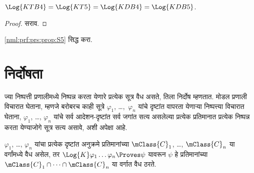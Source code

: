 \begin{prop}\label{nml:prf:prs:prop:S5}
  $\Log{KTB4} = \Log{KT5} = \Log{KDB4} = \Log{KDB5}$.
\end{prop}

\begin{proof}
  सराव.
\end{proof}

\begin{prob}
  \ref{nml:prf:prs:prop:S5} सिद्ध करा.
\end{prob}














\section{निर्दोषता}\label{nml:prf:snd:sec}

ज्या निष्पत्ती प्रणालीमध्ये निष्पन्न
करता येणारे प्रत्येक सूत्र वैध असते, तिला निर्दोष
म्हणतात. मोडल प्रणाली विचारात घेताना, म्हणजे
 बरोबरच काही सूत्रे $\varphi_1$,
\dots,~$\varphi_n$ यांचे दृष्टांत वापरता येणाऱ्या
निष्पत्त्या विचारात घेताना, $\varphi_1$, \dots,
$\varphi_n$ यांचे सर्व आदेशन-दृष्टांत सर्व जगांत सत्य असलेल्या
प्रत्येक प्रतिमानात प्रत्येक निष्पन्न करता येण्याजोगे सूत्र सत्य असावे,
अशी अपेक्षा आहे.

\begin{thm}[निर्दोषता प्रमेय]\label{nml:prf:snd:thm:soundness}
  $\varphi_1$, \dots, $\varphi_n$ यांचा प्रत्येक दृष्टांत
  अनुक्रमे प्रतिमानांच्या $\mClass{C}_1$, \dots,
  $\mClass{C}_n$ या वर्गांमध्ये वैध असेल,
  तर $\Log{K}\varphi_1\dots \varphi_n
  \Proves \psi$ यावरून $\psi$ हे प्रतिमानांच्या
  $\mClass{C}_1 \cap \dots \cap \mClass{C}_n$
  या वर्गात वैध ठरते.
\end{thm}

